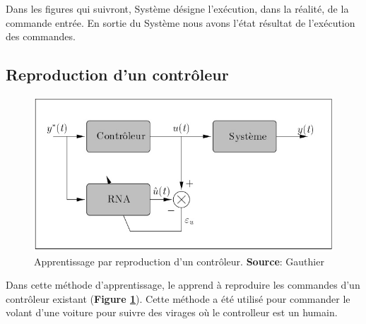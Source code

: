 Dans les figures qui suivront, Système désigne l'exécution, dans la réalité, de la commande entrée.
En sortie du Système nous avons l'état résultat de l'exécution des commandes.

\subsection{Reproduction d'un contrôleur}
\begin{figure}
 \centering
 \includegraphics[scale=0.5]{../figures/appsimple.jpg}
 \caption{Apprentissage par reproduction d'un contrôleur. \textbf{Source}: Gauthier\cite{Gauthier}}
 \label{appcontroleur}
\end{figure}
Dans cette méthode d'apprentissage, le \rna apprend à reproduire les commandes d'un contrôleur existant (\textbf{Figure \ref{appcontroleur}}).
Cette méthode a été utilisé pour commander le volant d'une voiture pour suivre des virages où le controlleur est un humain.\cite{Pomerleau}

